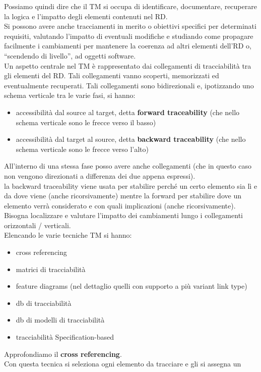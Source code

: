 \documentclass[a4paper,12pt, oneside]{book}
\begin{document}
Possiamo quindi dire che il TM si occupa di identificare, documentare,
recuperare la logica e l'impatto degli elementi contenuti nel RD. \\
Si possono avere anche tracciamenti in merito o obiettivi specifici per
determinati requisiti, valutando l'impatto di eventuali modifiche e studiando
come propagare facilmente i cambiamenti per mantenere la coerenza ad altri
elementi dell'RD o, ``scendendo di livello'', ad oggetti software.\\
Un aspetto centrale nel TM è rappresentato dai collegamenti di tracciabilità tra
gli elementi del RD. Tali collegamenti vanno scoperti, memorizzati ed
eventualmente recuperati. Tali collegamenti sono bidirezionali e, ipotizzando
uno schema verticale tra le varie fasi, si hanno:
\begin{itemize}
  \item accessibilità dal source al target, detta \textbf{forward traceability}
  (che nello schema verticale sono le frecce verso il basso)
  \item accessibilità dal target al source, detta \textbf{backward
    traceability} (che nello schema verticale sono le frecce verso l'alto)
\end{itemize}
All'interno di una stessa fase posso avere anche collegamenti (che in questo
caso non vengono direzionati a differenza dei due appena espressi).\\
la backward traceability viene usata per stabilire perché un certo elemento sia
lì e da dove viene (anche ricorsivamente) mentre la forward per stabilire dove
un elemento verrà considerato e con quali implicazioni (anche
ricorsivamente). Bisogna localizzare e valutare l'impatto dei cambiamenti lungo i
collegamenti orizzontali / verticali. \\
Elencando le varie tecniche TM si hanno:
\begin{itemize}
  \item cross referencing
  \item matrici di tracciabilità
  \item feature diagrams (nel dettaglio quelli con supporto a più variant link
  type) 
  \item db di tracciabilità
  \item db di modelli di tracciabilità
  \item tracciabilità Specification-based
\end{itemize}
Approfondiamo il \textbf{cross referencing}.\\
Con questa tecnica si seleziona ogni elemento da tracciare e gli si assegna un
\end{document}
